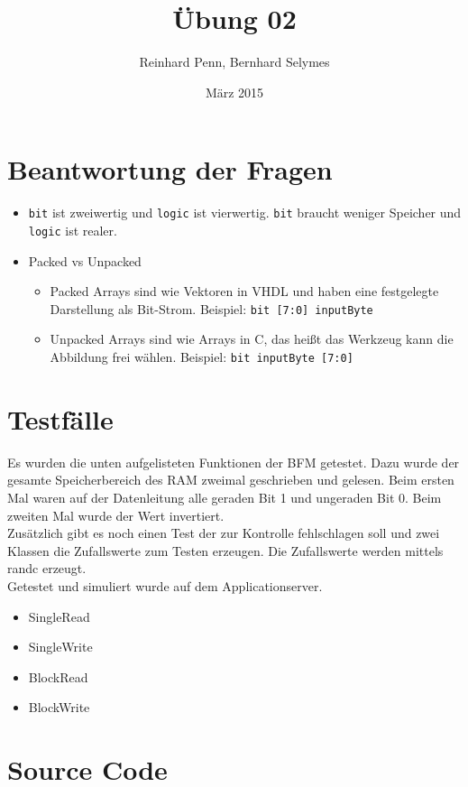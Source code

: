 \documentclass[12pt,a4paper]{article}
\begin{document}
\title{Übung 02}
\author{Reinhard Penn, Bernhard Selymes}
\date{März 2015}

\normalsize


\newcommand{\Uebung}{BFMSV}
\newcommand{\srcpath}{../../src}
\newcommand{\simpath}{../../sim}



\section{Beantwortung der Fragen}

\begin{itemize}
	\item \texttt{bit} ist zweiwertig und \texttt{logic} ist vierwertig. \texttt{bit} braucht weniger Speicher und \texttt{logic} ist realer.
	\item Packed vs Unpacked
		\begin{itemize}
			\item Packed Arrays sind wie Vektoren in VHDL und haben eine festgelegte Darstellung als Bit-Strom. Beispiel: \texttt{bit [7:0] inputByte}
			\item Unpacked Arrays sind wie Arrays in C, das heißt das Werkzeug kann die Abbildung frei wählen. Beispiel: \texttt{bit inputByte [7:0]}
		\end{itemize}
\end{itemize}


\section{Testfälle}
Es wurden die unten aufgelisteten Funktionen der BFM getestet. Dazu wurde der gesamte Speicherbereich des RAM zweimal geschrieben und gelesen. Beim ersten Mal waren auf der Datenleitung alle geraden Bit 1 und ungeraden Bit 0. Beim zweiten Mal wurde der Wert invertiert. 
\\
Zusätzlich gibt es noch einen Test der zur Kontrolle fehlschlagen soll und zwei Klassen die Zufallswerte zum Testen erzeugen. Die Zufallswerte werden mittels randc erzeugt.
\\
Getestet und simuliert wurde auf dem Applicationserver.

\begin{itemize}
	\item SingleRead
	\item SingleWrite
	\item BlockRead
	\item BlockWrite
\end{itemize}

\section{Source Code}





\end{document}
